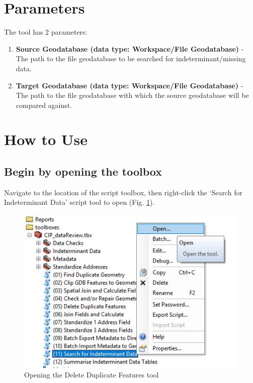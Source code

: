 \documentclass[openany]{book}
\providecommand{\tightlist}{%
  \setlength{\itemsep}{0pt}\setlength{\parskip}{0pt}}
\theoremstyle{definition}
\theoremstyle{definition}
\theoremstyle{definition}
\theoremstyle{remark}
\begin{document}
\section{Parameters}\label{parameters-8}

The tool has 2 parameters:

\begin{enumerate}
\def\labelenumi{\arabic{enumi}.}
\tightlist
\item
  \textbf{Source Geodatabase (data type: Workspace/File Geodatabase)} -
  The path to the file geodatabase to be searched for
  indeterminant/missing data.
\item
  \textbf{Target Geodatabase (data type: Workspace/File Geodatabase)} -
  The path to the file geodatabase with which the source geodatabase
  will be compared against.
\end{enumerate}

\section{How to Use}\label{how-to-use-8}

\subsection{Begin by opening the
toolbox}\label{begin-by-opening-the-toolbox-8}

Navigate to the location of the script toolbox, then right-click the
`Search for Indeterminant Data' script tool to open (Fig.
\ref{fig:indtSearchopen}).

\begin{figure}[H]

{\centering \includegraphics{figures/indtSearch-open} 

}

\caption{Opening the Delete Duplicate Features tool}\label{fig:indtSearchopen}
\end{figure}
\end{document}
